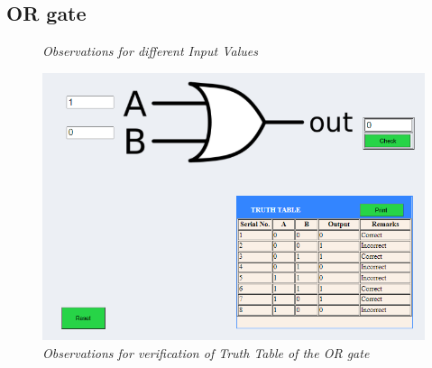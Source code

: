 \pagebreak
	\subsection{OR gate}
			\begin{figure}[ht]
				\centering 
				\hfill
				\caption{\textit{Observations for different Input Values}}
			\end{figure}
			\begin{figure}[h]
				\centering
				\includegraphics[width=0.85\linewidth]{img/exp1/fig15}
				\caption{\textit{Observations for verification of Truth Table of the OR gate}}
				\label{fig:or_obs_2}
			\end{figure}

\pagebreak
